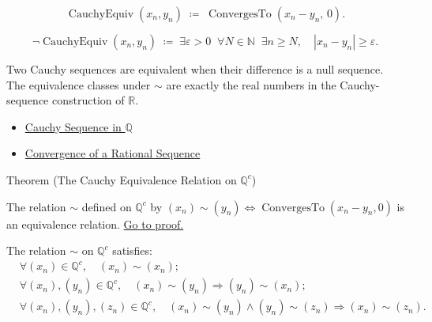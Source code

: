 \begin{remark*}
\[
\operatorname{CauchyEquiv}(x_n, y_n)
\;\coloneqq\;
\operatorname{ConvergesTo}(x_n - y_n,\, 0).
\]
\end{remark*}

\begin{remark*}
\[
\neg\operatorname{CauchyEquiv}(x_n, y_n)
\;\coloneqq\;
\exists \varepsilon > 0 \;\; \forall N \in \mathbb{N} \;\; \exists n \geq N,
\quad |x_n - y_n| \geq \varepsilon.
\]
\end{remark*}

\begin{remark*}[Interpretation]
Two Cauchy sequences are equivalent when their difference is a null sequence.
The equivalence classes under $\sim$ are exactly the real numbers in the
Cauchy-sequence construction of $\mathbb{R}$.
\end{remark*}

\begin{dependencies}
\begin{itemize}
  \item \hyperref[def:cauchy-rational]{Cauchy Sequence in $\mathbb{Q}$}
  \item \hyperref[def:convergent-rational-sequence]{Convergence of a Rational Sequence}
\end{itemize}
\end{dependencies}

\begin{theorembox}{Theorem (The Cauchy Equivalence Relation on $\mathbb{Q}^c$)}
\begin{theorem}
\label{thm:cauchy-equivalence-is-equivalence}
The relation $\sim$ defined on $\mathbb{Q}^c$ by
$(x_n) \sim (y_n) \Longleftrightarrow \operatorname{ConvergesTo}(x_n - y_n, 0)$
is an equivalence relation.
\hyperref[prf:cauchy-equivalence-is-equivalence]{Go to proof.}
\end{theorem}
\end{theorembox}

\begin{remark*}
The relation $\sim$ on $\mathbb{Q}^c$ satisfies:
\begin{align*}
&\forall (x_n) \in \mathbb{Q}^c,\quad (x_n) \sim (x_n); \\
&\forall (x_n),(y_n) \in \mathbb{Q}^c,\quad
  (x_n) \sim (y_n) \Longrightarrow (y_n) \sim (x_n); \\
&\forall (x_n),(y_n),(z_n) \in \mathbb{Q}^c,\quad
  (x_n) \sim (y_n) \land (y_n) \sim (z_n)
  \Longrightarrow (x_n) \sim (z_n).
\end{align*}
\end{remark*}

